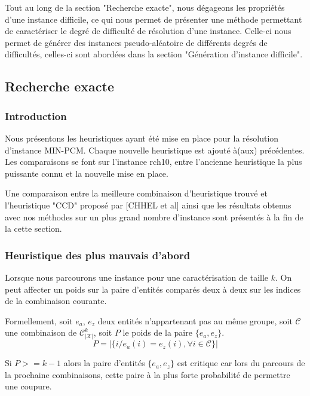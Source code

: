 \documentclass[a4paper,12pt]{article}
\begin{document}
Tout au long de la section "Recherche exacte", nous dégageons les propriétés d'une instance difficile, ce qui nous permet de présenter une méthode permettant de caractériser le degré de difficulté de résolution d'une instance. Celle-ci nous permet de générer des instances pseudo-aléatoire de différents degrés de difficultés, celles-ci sont abordées dans la section "Génération d'instance difficile".

\subsection{Recherche exacte}
\subsubsection{Introduction}
Nous présentons les heuristiques ayant été mise en place pour la résolution d'instance MIN-PCM. Chaque nouvelle heuristique est ajouté à(aux) précédentes. Les comparaisons se font sur l'instance rch10, entre l'ancienne heuristique la plus puissante connu et la nouvelle mise en place. 

Une comparaison entre la meilleure combinaison d'heuristique trouvé et l'heuristique "CCD" proposé par [CHHEL et al] ainsi que les résultats obtenus avec nos méthodes sur un plus grand nombre d'instance sont présentés à la fin de la cette section. 

\subsubsection{Heuristique des plus mauvais d'abord}
Lorsque nous parcourons une instance pour une caractérisation de taille $k$. On peut affecter un poids sur la paire d'entités comparés deux à deux sur les indices de la combinaison courante.

Formellement, soit $e_a$, $e_z$ deux entités n'appartenant pas au même groupe, soit $\mathcal{C}$ une combinaison de $\mathcal{C}_{|\mathcal{X}|}^k$, soit $P$ le poids de la paire $\{e_a,e_z\}$.
$$ P = |\{i / e_a(i)=e_z(i), \forall i \in \mathcal{C}\}| $$

Si $P>=k-1$ alors la paire d'entités $\{e_a,e_z\}$ est critique car lors du parcours de la prochaine combinaisons, cette paire à la plus forte probabilité de permettre une coupure.
\end{document}
